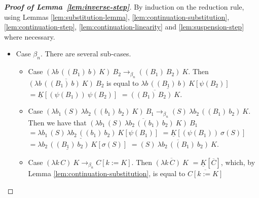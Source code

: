 \documentclass{LMCS}
\newcommand{\xto}[1]{\ensuremath{\rightarrow_{#1}}}
\newcommand{\tobn}{\xto{\beta_n}}
\begin{document}
\begin{proof}[\bf Proof of Lemma~\ref{lem:inverse-step}]
  By induction on the reduction rule, using Lemmas \ref{lem:substitution-lemma},
  \ref{lem:continuation-substitution}, \ref{lem:continuation-step},
  \ref{lem:continuation-linearity} and \ref{lem:suspension-step} where
  necessary.
  \begin{itemize}
    \item Case $\beta_{n}$. There are several sub-cases.
      \begin{itemize}
	\item Case $(\lambda b\,((B_{1})~b)~K)~B_{2}\tobn ((B_{1})~B_{2})~K$. Then 
	  $\overline{(\lambda b\,((B_{1})~b)~K)~B_{2}}$
	  is equal to
	  $\underline{\lambda b\,((B_{1})~b)~K}[\psi(B_{2})]$
	  $=\underline{K}[(\psi(B_{1}))~\psi(B_{2})]$
	  $=\overline{((B_{1})~B_{2})~K}$.

	\item Case $(\lambda b_1\,(S)~\lambda b_2\,((b_{1})~b_{2})~K)~B_{1}\tobn (S)~\lambda b_{2}\,((B_{1})~b_{2})~K$. Then we have that
	  $\overline{(\lambda b_1\,(S)~\lambda b_2\,((b_{1})~b_{2})~K)~B_{1}}$
	  $=\!\underline{\lambda b_1\,(S)\,\lambda b_2\,((b_{1})~b_{2})~K}[\psi(B_{1})]$
	  $=\!\underline{K}[(\psi(B_{1}))~\sigma(S)]$
	  $=\underline{\lambda b_2\,((B_{1})~b_{2})~K}[\sigma(S)]$
	  $=\overline{(S)~\lambda b_2\,((B_{1})~b_{2})~K}$.

	\item Case $(\lambda k\,C)~K\tobn C[k:=K]$. Then
	  $\overline{(\lambda k\,C)~K}$
	  $=\underline{K}[\overline{C}]$,
	  which, by Lemma \ref{lem:continuation-substitution}, is equal to
	  $\overline{C[k:=K]}$


\end{itemize}
\end{itemize}
\end{proof}
\end{document}
